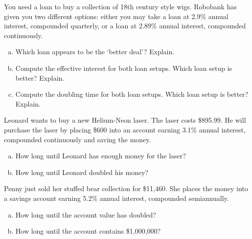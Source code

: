 \documentclass[11pt,letterpaper]{article}
\begin{document}

 You need a loan to buy a collection of 18th century style wigs. Robobank has given you two different options: either you may take a loan at 2.9\% annual interest, compounded quarterly, or a loan at 2.89\% annual interest, compounded continuously. 
	\begin{enumerate}[(a)]
	\item Which loan appears to be the `better deal'? Explain. 
	\item Compute the effective interest for both loan setups. Which loan setup is better? Explain. 
	\item Compute the doubling time for both loan setups. Which loan setup is better? Explain.
	\end{enumerate}



\newpage



 Leonard wants to buy a new Helium-Neon laser. The laser costs \$895.99. He will purchase the laser by placing \$600 into an account earning 3.1\% annual interest, compounded continuously and saving the money. 
	\begin{enumerate}[(a)]
	\item How long until Leonard has enough money for the laser?
	\item How long until Leonard doubled his money?
	\end{enumerate}



\newpage



 Penny just sold her stuffed bear collection for \$11,460. She places the money into a savings account earning 5.2\% annual interest, compounded semiannually. 
	\begin{enumerate}[(a)]
	\item How long until the account value has doubled?
	\item How long until the account contains \$1,000,000?
	\end{enumerate}
\end{document}
